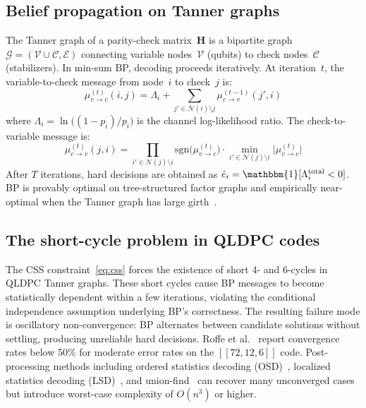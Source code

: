 \documentclass[a4paper,twocolumn,11pt,unpublished,nopdfoutputerror]{quantumarticle}
\newcommand{\llr}{\Lambda}
\newcommand{\Hmat}{\mathbf{H}}
\newcommand{\code}[3]{\ensuremath{[\![#1,#2,#3]\!]}}
\begin{document}
\subsection{Belief propagation on Tanner graphs}\label{sec:bp}

The Tanner graph of a parity-check matrix~$\Hmat$ is a bipartite graph $\mathcal{G} = (\mathcal{V} \cup \mathcal{C}, \mathcal{E})$ connecting variable nodes~$\mathcal{V}$ (qubits) to check nodes~$\mathcal{C}$ (stabilizers). In min-sum BP, decoding proceeds iteratively. At iteration~$t$, the variable-to-check message from node~$i$ to check~$j$ is:
\begin{equation}
\mu_{v \to c}^{(t)}(i,j) = \llr_i + \!\!\sum_{j' \in \mathcal{N}(i)\setminus j}\!\! \mu_{c \to v}^{(t-1)}(j',i)
\label{eq:vtc}
\end{equation}
where $\llr_i = \ln\bigl((1-p_i)/p_i\bigr)$ is the channel log-likelihood ratio. The check-to-variable message is:
\begin{equation}
\mu_{c \to v}^{(t)}(j,i) = \!\!\prod_{i' \in \mathcal{N}(j)\setminus i}\!\! \mathrm{sgn}\bigl(\mu_{v \to c}^{(t)}\bigr) \cdot \!\!\min_{i' \in \mathcal{N}(j)\setminus i}\!\! \bigl|\mu_{v \to c}^{(t)}\bigr|
\label{eq:ctv}
\end{equation}
After $T$ iterations, hard decisions are obtained as $\hat{e}_i = \mathbbm{1}[\llr_i^{\text{total}} < 0]$. BP is provably optimal on tree-structured factor graphs and empirically near-optimal when the Tanner graph has large girth~\cite{Richardson2001Capacity}.

\subsection{The short-cycle problem in QLDPC codes}\label{sec:shortcycle}

The CSS constraint~\eqref{eq:css} forces the existence of short 4- and 6-cycles in QLDPC Tanner graphs. These short cycles cause BP messages to become statistically dependent within a few iterations, violating the conditional independence assumption underlying BP's correctness. The resulting failure mode is oscillatory non-convergence: BP alternates between candidate solutions without settling, producing unreliable hard decisions. Roffe et al.~\cite{Roffe2020Landscape} report convergence rates below 50\% for moderate error rates on the $\code{72}{12}{6}$ code. Post-processing methods including ordered statistics decoding (OSD)~\cite{Fossorier1995OSD}, localized statistics decoding (LSD)~\cite{Panteleev2021QLDPC}, and union-find~\cite{Delfosse2021UF} can recover many unconverged cases but introduce worst-case complexity of $O(n^3)$ or higher.
\end{document}
